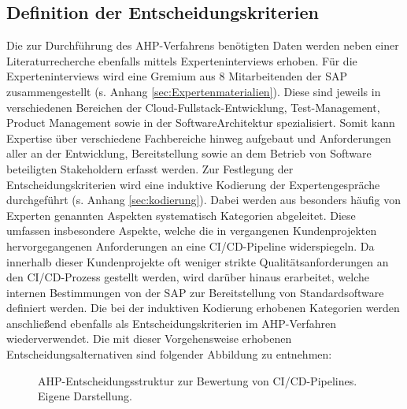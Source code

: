 \subsection{Definition der Entscheidungskriterien}
 Die zur Durchführung des AHP-Verfahrens benötigten Daten werden neben einer Literaturrecherche ebenfalls mittels Experteninterviews erhoben. Für die Experteninterviews wird eine Gremium aus 8 Mitarbeitenden der SAP zusammengestellt (s. Anhang \ref{sec:Expertenmaterialien}). Diese sind jeweils in verschiedenen Bereichen der Cloud-Fullstack-Entwicklung, Test-Management, Product Management sowie in der Software\-Architektur spezialisiert. Somit kann Expertise über verschiedene Fachbereiche hinweg aufgebaut und Anforderungen aller an der Entwicklung, Bereitstellung sowie an dem Betrieb von Software beteiligten Stakeholdern erfasst werden. Zur Festlegung der Entscheidungskriterien wird eine induktive Kodierung der Expertengespräche durchgeführt (s. Anhang \ref{sec:kodierung}). Dabei werden aus besonders häufig von Experten genannten Aspekten systematisch Kategorien abgeleitet. Diese umfassen insbesondere Aspekte, welche die in vergangenen Kundenprojekten hervorgegangenen Anforderungen an eine CI/CD-Pipeline widerspiegeln. Da innerhalb dieser Kundenprojekte oft weniger strikte Qualitätsanforderungen an den CI/CD-Prozess gestellt werden, wird darüber hinaus erarbeitet, welche internen Bestimmungen von der SAP zur Bereitstellung von Standardsoftware definiert werden. Die bei der induktiven Kodierung erhobenen Kategorien werden anschließend ebenfalls als Entscheidungskriterien im AHP-Verfahren wiederverwendet. Die mit dieser Vorgehensweise erhobenen Entscheidungsalternativen sind folgender Abbildung zu entnehmen:
 \begin{center}
	\begin{figure}[H]
		\centering
		\caption[AHP-Entscheidungsstruktur zur Bewertung von CI/CD-Pipelines]{AHP-Entscheidungsstruktur zur Bewertung von CI/CD-Pipelines. Eigene Darstellung.}
		\label{fig:AHP_E}
	\end{figure}
\end{center}
\vspace*{-15mm}
